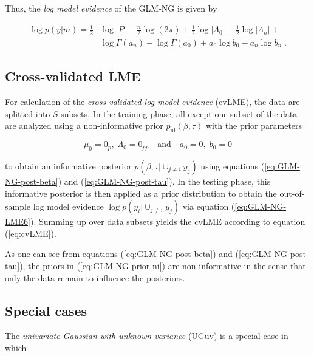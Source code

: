 Thus, the \textit{log model evidence} of the GLM-NG is given by

\vspace{-0.5em}
\begin{equation} \label{eq:GLM-NG-LME6}
\begin{split}
\log p(y|m) = \frac{1}{2} & \log |P| - \frac{n}{2} \log (2 \pi)  + \frac{1}{2} \log |\Lambda_0| - \frac{1}{2} \log |\Lambda_n| + \\ & \log \Gamma(a_n) - \log \Gamma(a_0) + a_0 \log b_0 - a_n \log b_n \; .
\end{split}
\end{equation}


\pagebreak
\subsection{Cross-validated LME} \label{sec:GLM-NG-cvLME}

For calculation of the \textit{cross-validated log model evidence} (cvLME), the data are splitted into $S$ subsets. In the training phase, all except one subset of the data are analyzed using a non-informative prior $p_\mathrm{ni}(\beta, \tau)$ with the prior parameters

\begin{equation} \label{eq:GLM-NG-prior-ni}
\mu_0 = 0_{p}, \; \Lambda_0 = 0_{pp} \quad \text{and} \quad a_0 = 0, \; b_0 = 0
\end{equation}

to obtain an informative posterior $p(\beta, \tau|\cup_{j \neq i} y_j)$ using equations (\ref{eq:GLM-NG-post-beta}) and (\ref{eq:GLM-NG-post-tau}). In the testing phase, this informative posterior is then applied as a prior distribution to obtain the out-of-sample log model evidence $\log p(y_i|\cup_{j \neq i} y_j)$ via equation (\ref{eq:GLM-NG-LME6}). Summing up over data subsets yields the cvLME according to equation (\ref{eq:cvLME}).

As one can see from equations (\ref{eq:GLM-NG-post-beta}) and (\ref{eq:GLM-NG-post-tau}), the priors in (\ref{eq:GLM-NG-prior-ni}) are non-informative in the sense that only the data remain to influence the posteriors.


\subsection{Special cases} \label{sec:GLM-NG-Spec}

The \textit{univariate Gaussian with unknown variance} (UGuv) is a special case in which

